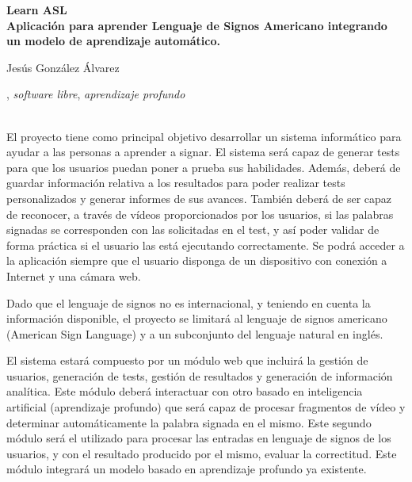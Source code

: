 \cleardoublepage

\begin{center}
	{\large\bfseries Learn ASL \\ Aplicación para aprender Lenguaje de Signos Americano integrando un modelo de aprendizaje automático.}\\
\end{center}
\begin{center}
	Jesús González Álvarez\\
\end{center}
\vspace{0.5cm}
, \textit{software libre}, \textit{aprendizaje profundo}
\vspace{0.7cm}

\\

\bigskip
El proyecto tiene como principal objetivo desarrollar un sistema informático para ayudar a las personas a aprender a signar. El sistema será capaz de generar tests para que los usuarios puedan poner a prueba sus habilidades. Además, deberá de guardar información relativa a los resultados para poder realizar tests personalizados y generar informes de sus avances. También deberá de ser capaz de reconocer, a través de vídeos proporcionados por los usuarios, si las palabras signadas se corresponden con las solicitadas en el test, y así poder validar de forma práctica si el usuario las está ejecutando correctamente. Se podrá acceder a la aplicación siempre que el usuario disponga de un dispositivo con conexión a Internet y una cámara web.

\bigskip
Dado que el lenguaje de signos no es internacional, y teniendo en cuenta la información disponible, el proyecto se limitará al lenguaje de signos americano (American Sign Language) y a un subconjunto del lenguaje natural en inglés.

\bigskip
El sistema estará compuesto por un módulo web que incluirá la gestión de usuarios, generación de tests, gestión de resultados y generación de información analítica. Este módulo deberá interactuar con otro basado en inteligencia artificial (aprendizaje profundo) que será capaz de procesar fragmentos de vídeo y determinar automáticamente la palabra signada en el mismo. Este segundo módulo será el utilizado para procesar las entradas en lenguaje de signos de los usuarios, y con el resultado producido por el mismo, evaluar la correctitud. Este módulo integrará un modelo basado en aprendizaje profundo ya existente.

